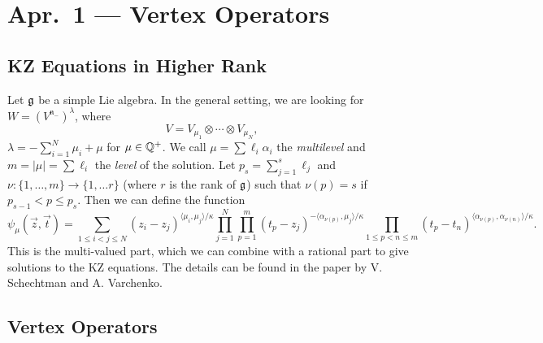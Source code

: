 \chapter{Apr.~1 --- Vertex Operators}

\section{KZ Equations in Higher Rank}

\begin{remark}
  Let $\mathfrak{g}$ be a simple Lie algebra.
  In the general setting, we are looking
  for $W = (V^{\mathfrak{n}_-})^\lambda$,
  where
  \[
    V = V_{\mu_1} \otimes \cdots \otimes V_{\mu_N},
  \]
  $\lambda = - \sum_{i = 1}^N \mu_i + \mu$
  for $\mu \in \mathbb{Q}^+$. We call
  $\mu = \sum \ell_i \alpha_i$ the
  \emph{multilevel} and $m = |\mu| = \sum \ell_i$
  the \emph{level} of the solution.
  Let $p_s = \sum_{j = 1}^s \ell_j$ and
  $\nu : \{1, \dots, m\} \to \{1, \dots r\}$
  (where $r$ is the rank of $\mathfrak{g}$)
  such that $\nu(p) = s$ if
  $p_{s - 1} < p \le p_s$. Then we can define
  the function
  \[
    \psi_{\mu}(\vec{z}, \vec{t})
    = \sum_{1 \le i < j \le N} (z_i - z_j)^{\langle \mu_i, \mu_j \rangle / \kappa}
    \prod_{j = 1}^N \prod_{p = 1}^m (t_p - z_j)^{- \langle \alpha_{\nu(p)}, \mu_j \rangle / \kappa}
    \prod_{1 \le p < n \le m} (t_p - t_n)^{\langle \alpha_{\nu(p)}, \alpha_{\nu(n)} \rangle / \kappa}.
  \]
  This is the multi-valued part, which we can
  combine with a rational part to give solutions
  to the KZ equations.
  The details can be found in the paper
  by V. Schechtman and A. Varchenko.
\end{remark}

\section{Vertex Operators}

